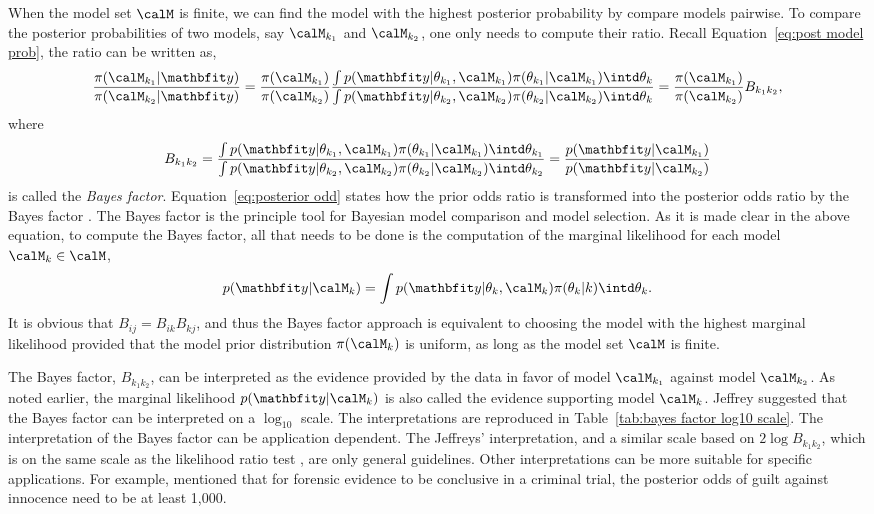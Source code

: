 When the model set $\calM$ is finite, we can find the model with the highest
posterior probability by compare models pairwise. To compare the posterior
probabilities of two models, say $\calM_{k_1}$ and $\calM_{k_2}$, one only
needs to compute their ratio. Recall Equation~\eqref{eq:post model prob}, the
ratio can be written as,
\begin{equation}
  \frac{\pi(\calM_{k_1}|\data)}{\pi(\calM_{k_2}|\data)}
  = \frac{\pi(\calM_{k_1})}{\pi(\calM_{k_2})} \frac
  {\int p(\data|\theta_{k_1},\calM_{k_1})\pi(\theta_{k_1}|\calM_{k_1})
      \intd\theta_k}
  {\int p(\data|\theta_{k_2},\calM_{k_2})\pi(\theta_{k_2}|\calM_{k_2})
      \intd\theta_k}
  = \frac{\pi(\calM_{k_1})}{\pi(\calM_{k_2})}B_{k_1k_2},
  \label{eq:posterior odd}
\end{equation}
where
\begin{equation}
  B_{k_1k_2} = \frac
  {\int p(\data|\theta_{k_1},\calM_{k_1})\pi(\theta_{k_1}|\calM_{k_1})
      \intd\theta_{k_1}}
  {\int p(\data|\theta_{k_2},\calM_{k_2})\pi(\theta_{k_2}|\calM_{k_2})
      \intd\theta_{k_2}}
    = \frac{p(\data|\calM_{k_1})}{p(\data|\calM_{k_2})}
  \label{eq:bayes factor}
\end{equation}
is called the \emph{Bayes factor}. Equation~\eqref{eq:posterior odd} states
how the prior odds ratio is transformed into the posterior odds ratio by the
Bayes factor \cite{Kass:1995vb}. The Bayes factor is the principle tool for
Bayesian model comparison and model selection. As it is made clear in the
above equation, to compute the Bayes factor, all that needs to be done is the
computation of the marginal likelihood for each model $\calM_k\in\calM$,
\begin{equation*}
  p(\data|\calM_k) =
  \int p(\data|\theta_k,\calM_k)\pi(\theta_k|k)\intd\theta_k.
\end{equation*}
It is obvious that $B_{ij} = B_{ik}B_{kj}$, and thus the Bayes factor
approach is equivalent to choosing the model with the highest marginal
likelihood provided that the model prior distribution $\pi(\calM_k)$ is
uniform, as long as the model set $\calM$ is finite.

The Bayes factor, $B_{k_1k_2}$, can be interpreted as the evidence provided
by the data in favor of model $\calM_{k_1}$ against model $\calM_{k_2}$. As
noted earlier, the marginal likelihood $p(\data|\calM_k)$ is also called the
evidence supporting model $\calM_k$. Jeffrey \cite{Jeffreys:1961ua} suggested
that the Bayes factor can be interpreted on a $\log_{10}$ scale. The
interpretations are reproduced in Table~\ref{tab:bayes factor log10 scale}.
The interpretation of the Bayes factor can be application dependent. The
Jeffreys' interpretation, and a similar scale based on $2\log B_{k_1k_2}$,
which is on the same scale as the likelihood ratio test \cite{Kass:1995vb},
are only general guidelines. Other interpretations can be more suitable for
specific applications. For example, \cite{Kass:1995vb} mentioned that for
forensic evidence to be conclusive in a criminal trial, the posterior odds of
guilt against innocence need to be at least 1,000.

